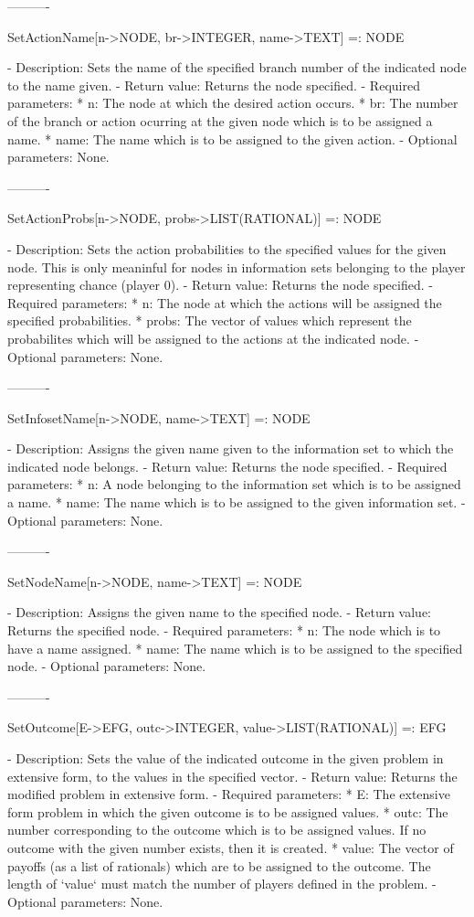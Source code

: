 \begin{itemize}
----------

SetActionName[n->NODE, br->INTEGER, name->TEXT] =: NODE

   -	Description:  Sets the name of the specified branch number of the 
	indicated node to the name given.
   -	Return value:  Returns the node specified.
   -	Required parameters:
	  *  n:  The node at which the desired action occurs.
	  *  br:  The number of the branch or action ocurring at the given node
		which is to be assigned a name.
	  *  name:  The name which is to be assigned to the given action.
   -	Optional parameters:  None.

----------

SetActionProbs[n->NODE, probs->LIST(RATIONAL)] =: NODE

   -	Description:  Sets the action probabilities to the specified values 
	for the given node.  This is only meaninful for nodes in information
	sets belonging to the player representing chance (player 0).
   -	Return value:  Returns the node specified.
   -	Required parameters:
	  *  n:  The node at which the actions will be assigned the specified
		probabilities.
	  *  probs:  The vector of values which represent the probabilites 
		which will be assigned to the actions at the indicated node.
   -	Optional parameters:  None.

----------

SetInfosetName[n->NODE, name->TEXT] =: NODE

   -	Description:  Assigns the given name given to the information set to 
	which the indicated node belongs.
   -	Return value:  Returns the node specified.
   -	Required parameters:
	  *  n:  A node belonging to the information set which is to be 
		assigned a name.
	  *  name:  The name which is to be assigned to the given information
		set.
   -	Optional parameters:  None.

----------

SetNodeName[n->NODE, name->TEXT] =: NODE

   -	Description:  Assigns the given name to the specified node.
   -	Return value:  Returns the specified node.
   -	Required parameters:
	  *  n:  The node which is to have a name assigned.
	  *  name:  The name which is to be assigned to the specified node.
   -	Optional parameters:  None.

----------

SetOutcome[E->EFG, outc->INTEGER, value->LIST(RATIONAL)] =: EFG

   -	Description:  Sets the value of the indicated outcome in the given 
	problem in extensive form, to the values in the specified vector.
   -	Return value:  Returns the modified problem in extensive form. 
   -	Required parameters:
	  *  E:  The extensive form problem in which the given outcome is to be
		assigned values.
	  *  outc:  The number corresponding to the outcome which is to be 
		assigned values.  If no outcome with the given number exists,
		then it is created.
	  *  value:  The vector of payoffs (as a list of rationals) which are 
		to be assigned to the outcome.  The length of `value` must 
		match the number of players defined in the problem.
   -	Optional parameters:  None.



\end{itemize}
